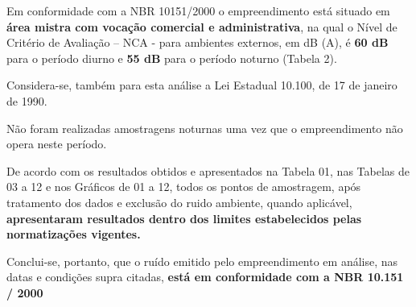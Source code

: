 Em conformidade com a NBR 10151/2000 o empreendimento  está situado em \textbf{área mistra com vocação comercial e administrativa}, na qual o Nível de Critério de Avaliação – NCA - para ambientes externos, em dB (A), é \textbf{60 dB} para o período diurno e \textbf{55 dB} para o período noturno (Tabela 2). 

Considera-se, também para esta análise a Lei Estadual 10.100, de 17 de janeiro de 1990.

Não foram realizadas amostragens noturnas uma vez que o empreendimento não opera neste período.

De acordo com os resultados obtidos e apresentados na Tabela 01, nas Tabelas de 03 a 12 e nos Gráficos de 01 a 12, todos os pontos de amostragem, após tratamento dos dados e exclusão do ruido ambiente, quando aplicável, \textbf{apresentaram resultados dentro dos limites estabelecidos pelas normatizações vigentes.}

Conclui-se, portanto, que o ruído emitido pelo empreendimento em análise, nas datas e condições supra citadas, \textbf{está em conformidade com a NBR 10.151 / 2000} \\